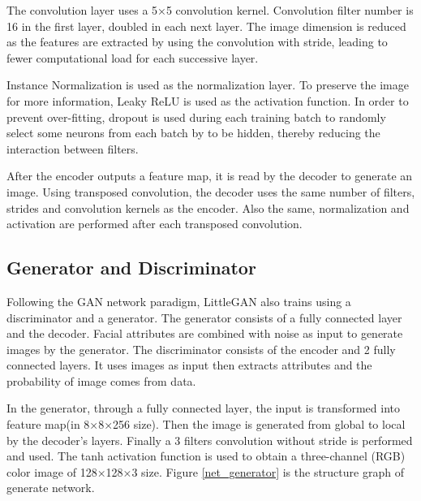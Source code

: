 The convolution layer uses a 5×5 convolution kernel.
Convolution filter number is 16 in the first layer, doubled in each next layer.
The image dimension is reduced as the features are extracted by using the convolution with stride,
    leading to fewer computational load for each successive layer.

Instance Normalization is used as the normalization layer.
To preserve the image for more information, Leaky ReLU is used as the activation function.
In order to prevent over-fitting,
    dropout is used during each training batch to randomly select some neurons from each batch by to be hidden,
    thereby reducing the interaction between filters.

After the encoder outputs a feature map, it is read by the decoder to generate an image.
Using transposed convolution, the decoder uses the same number of filters,
    strides and convolution kernels as the encoder.
Also the same, normalization and activation are performed after each transposed convolution.

\subsection{Generator and Discriminator}

Following the GAN network paradigm, LittleGAN also trains using a discriminator and a generator.
The generator consists of a fully connected layer and the decoder.
Facial attributes are combined with noise as input to generate images by the generator.
The discriminator consists of the encoder and 2 fully connected layers.
It uses images as input then extracts attributes and the probability of image comes from data.


In the generator, through a fully connected layer, the input is transformed into feature map(in 8×8×256 size).
Then the image is generated from global to local by the decoder's layers.
Finally a 3 filters convolution without stride is performed and used.
The tanh activation function is used to obtain a three-channel (RGB) color image of 128×128×3 size.
Figure \ref{net_generator} is the structure graph of generate network.

